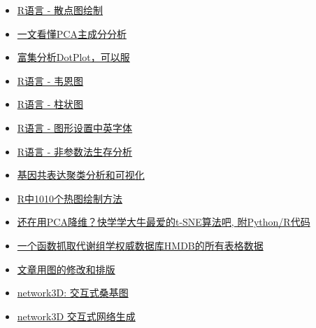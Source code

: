\documentclass[]{article}
\numberwithin{figure}{section}
\numberwithin{table}{section}
\begin{document}
\begin{itemize}
\item
  \href{http://mp.weixin.qq.com/s?__biz=MzI5MTcwNjA4NQ==\&mid=2247484056\&idx=1\&sn=f9b2b4f7495b432e9294b7cbf42eaf33\&chksm=ec0dc712db7a4e04769d322558364b4b401b0a8153097c7252e83170e9201a31c2a7abbaf101\#rd}{R语言 - 散点图绘制}
\item
  \href{http://mp.weixin.qq.com/s?__biz=MzI5MTcwNjA4NQ==\&mid=2247484036\&idx=1\&sn=22ee356d0c9680d56dada1b777985ed2\&chksm=ec0dc70edb7a4e182a21475e9ddcde35b907c291549cc8c2e767be260af445ff5455aa358b04\#rd}{一文看懂PCA主成分分析}
\item
  \href{http://mp.weixin.qq.com/s?__biz=MzI5MTcwNjA4NQ==\&mid=2247484063\&idx=1\&sn=f4e93d428e4910b4abbee9c0430cd170\&chksm=ec0dc715db7a4e0318b388ba2ab3d51677741421c42ada474a0ac6046a0699283014eae84b6f\#rd}{富集分析DotPlot，可以服}
\item
  \href{http://mp.weixin.qq.com/s?__biz=MzI5MTcwNjA4NQ==\&mid=2247484076\&idx=1\&sn=fa5af19a2a4db4b0c5c7f145bf93ca57\&chksm=ec0dc726db7a4e30fe7a0492ed9ea8eb5fa1c34641b1442a2da003efde0546b30c48fde3f118\#rd}{R语言 - 韦恩图}
\item
  \href{http://mp.weixin.qq.com/s?__biz=MzI5MTcwNjA4NQ==\&mid=2247484134\&idx=1\&sn=ffb41298eae74834af2f5dad05d37921\&chksm=ec0dc76cdb7a4e7a852ac0670532c12c690399f140a2335f640eaf01f7da26bc5480941686a9\#rd}{R语言 - 柱状图}
\item
  \href{http://mp.weixin.qq.com/s/NAwyvtTS7t5rRU7KKBwHTA}{R语言 - 图形设置中英字体}
\item
  \href{http://mp.weixin.qq.com/s/_Dy9Yn8fc8I0rASGxH5x9A}{R语言 - 非参数法生存分析}
\item
  \href{http://mp.weixin.qq.com/s/ST2SAmfKOptpJOHS8podmQ}{基因共表达聚类分析和可视化}
\item
  \href{http://mp.weixin.qq.com/s/N7oLvJ1oPIImgybJVVSxXg}{R中1010个热图绘制方法}
\item
  \href{http://mp.weixin.qq.com/s/alBfj3Y08qCnZoz5JwVdaw}{还在用PCA降维？快学学大牛最爱的t-SNE算法吧, 附Python/R代码}
\item
  \href{http://mp.weixin.qq.com/s/rYjcsfHrbcAhaFpQI5Yc6g}{一个函数抓取代谢组学权威数据库HMDB的所有表格数据}
\item
  \href{https://mp.weixin.qq.com/s/IJNyhinakY0lSXgCN7b9ug}{文章用图的修改和排版}
\item
  \href{http://mp.weixin.qq.com/s/3okqP0viU3EVML9p1bkQlw}{network3D: 交互式桑基图}
\item
  \href{https://mp.weixin.qq.com/s/rK5SolI0xGisvBCIcb448A}{network3D 交互式网络生成}
\end{itemize}
\end{document}
